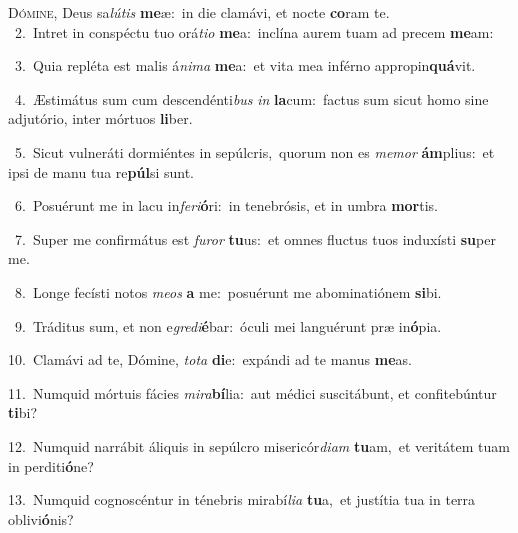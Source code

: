\lettrine{\initial\textcolor{\initialcolor}{D}}{ómine,} Deus sa\-\textit{lú}\-\textit{tis} \textbf{me}\-æ:~\star in die clamávi, et nocte \textbf{co}\-ram te.\\
{\numbfont\textcolor{\numbcolor}{~2.}}~Intret in conspéctu tuo orá\-\textit{ti}\-\textit{o} \textbf{me}\-a:~\star inclína aurem tuam ad precem \textbf{me}\-am:\par
{\numbfont\textcolor{\numbcolor}{~3.}}~Quia repléta est malis á\-\textit{ni}\-\textit{ma} \textbf{me}\-a:~\star et vita mea inférno appropin\-\textbf{quá}\-vit.\par
{\numbfont\textcolor{\numbcolor}{~4.}}~Æstimátus sum cum descendénti\textit{bus} \textit{in} \textbf{la}\-cum:~\star factus sum sicut homo sine adjutório, inter mórtuos \textbf{li}\-ber.\par
{\numbfont\textcolor{\numbcolor}{~5.}}~Sicut vulneráti dormiéntes in sepúlcris,~\dagger quorum non es \textit{me}\-\textit{mor} \textbf{ám}\-plius:~\star et ipsi de manu tua re\-\textbf{púl}\-si sunt.\par
{\numbfont\textcolor{\numbcolor}{~6.}}~Posuérunt me in lacu in\-\textit{fe}\-\textit{ri}\textbf{ó}ri:~\star in tenebrósis, et in umbra \textbf{mor}\-tis.\par
{\numbfont\textcolor{\numbcolor}{~7.}}~Super me confirmátus est \textit{fu}\-\textit{ror} \textbf{tu}\-us:~\star et omnes fluctus tuos induxísti \textbf{su}\-per me.\par
{\numbfont\textcolor{\numbcolor}{~8.}}~Longe fecísti notos \textit{me}\-\textit{os} \textbf{a} me:~\star posuérunt me abominatiónem \textbf{si}\-bi.\par
{\numbfont\textcolor{\numbcolor}{~9.}}~Tráditus sum, et non e\-\textit{gre}\-\textit{di}\textbf{é}bar:~\star óculi mei languérunt præ in\-\textbf{ó}\-pia.\par
{\numbfont\textcolor{\numbcolor}{10.}}~Clamávi ad te, Dómine, \textit{to}\-\textit{ta} \textbf{di}\-e:~\star expándi ad te manus \textbf{me}\-as.\par
{\numbfont\textcolor{\numbcolor}{11.}}~Numquid mórtuis fácies \textit{mi}\-\textit{ra}\textbf{bí}lia:~\star aut médici suscitábunt, et confitebúntur \textbf{ti}\-bi?\par
{\numbfont\textcolor{\numbcolor}{12.}}~Numquid narrábit áliquis in sepúlcro misericór\-\textit{di}\-\textit{am} \textbf{tu}\-am,~\star et veritátem tuam in perditi\-\textbf{ó}\-ne?\par
{\numbfont\textcolor{\numbcolor}{13.}}~Numquid cognoscéntur in ténebris mirabí\-\textit{li}\-\textit{a} \textbf{tu}\-a,~\star et justítia tua in terra oblivi\-\textbf{ó}\-nis?\par
